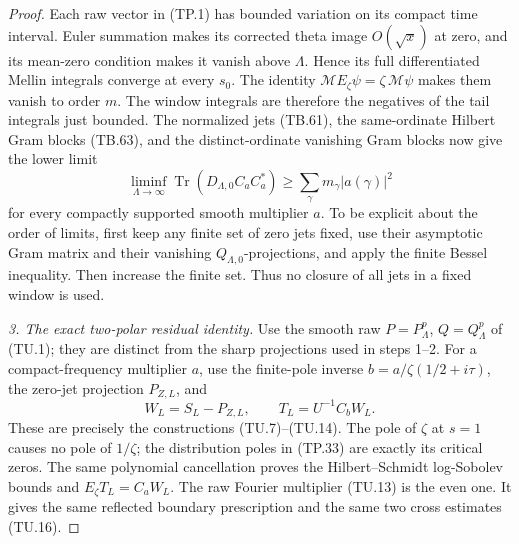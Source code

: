 \begin{proof}
Each raw vector in (TP.1) has bounded variation on
its compact time interval.  Euler summation makes
its corrected theta image \(O(\sqrt{x})\) at zero,
and its mean-zero condition makes it vanish above
\(\Lambda\).  Hence its full differentiated Mellin
integrals converge at every \(s_0\).
The identity \(\mathcal M E_\zeta\psi=\zeta\,\mathcal M\psi\)
makes them vanish to order \(m\).
The window integrals are therefore the negatives
of the tail integrals just bounded.
The normalized jets (TB.61), the same-ordinate
Hilbert Gram blocks (TB.63), and the distinct-ordinate
vanishing Gram blocks now give the lower limit
\[
 \liminf_{\Lambda\to\infty}
       \operatorname{Tr}(D_{\Lambda,0}C_aC_a^*)
                 \geq\sum_\gamma m_\gamma|a(\gamma)|^2
 \tag{TP.32}
\]
for every compactly supported smooth multiplier \(a\).
To be explicit about the order of limits, first keep
any finite set of zero jets fixed, use their
asymptotic Gram matrix and their vanishing
\(Q_{\Lambda,0}\)-projections, and apply the finite
Bessel inequality.  Then increase the finite set.
Thus no closure of all jets in a fixed window is used.

\emph{3. The exact two-polar residual identity.}
Use the smooth raw \(P=P_\Lambda^p\), \(Q=Q_\Lambda^p\)
of (TU.1); they are distinct from the sharp
projections used in steps 1--2.
For a compact-frequency multiplier \(a\), use the
finite-pole inverse \(b=a/\zeta(1/2+i\tau)\),
the zero-jet projection \(P_{Z,L}\), and
\[
             W_L=S_L-P_{Z,L},\qquad
             T_L=U^{-1}C_bW_L .
 \tag{TP.33}
\]
These are precisely the constructions (TU.7)--(TU.14).
The pole of \(\zeta\) at \(s=1\) causes no pole of
\(1/\zeta\); the distribution poles in (TP.33)
are exactly its critical zeros.
The same polynomial cancellation proves the
Hilbert--Schmidt log-Sobolev bounds and
\(E_\zeta T_L=C_aW_L\).
The raw Fourier multiplier (TU.13) is the even one.
It gives the same reflected boundary prescription
and the same two cross estimates (TU.16).


\end{proof}

